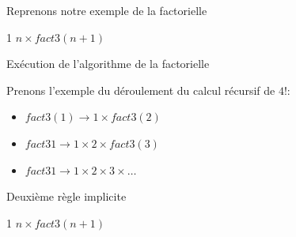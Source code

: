 \documentclass[10pt,xcolor=dvipsnames]{beamer}
\begin{document}
\begin{frame}{Reprenons notre exemple de la factorielle}
    
    \begin{tcolorbox}
  \begin{algorithmic}[1]
        \State{} 1
      \Else
        \State{} $n \times fact3(n+1)$
      \EndIf
    \EndFunction
  \end{algorithmic}
\end{tcolorbox}

\end{frame}

\begin{frame}{Exécution de l'algorithme de la factorielle}

Prenons l'exemple du déroulement du calcul récursif de $4!$:
\begin{center}
    \begin{itemize}[<+->]
\item[] $fact3(1) \rightarrow 1 \times fact3(2)$
\item[] $fact3{1} \rightarrow 1 \times 2 \times fact3(3)$
\item[] $fact3{1} \rightarrow 1 \times 2 \times 3 \times \ldots$
\end{itemize}
\end{center}

\end{frame}

\begin{frame}{Deuxième règle implicite}
        \begin{tcolorbox}
  \begin{algorithmic}[1]
        \State{} 1
      \Else
        \State{} $n \times fact3(n+1)$
      \EndIf
    \EndFunction
  \end{algorithmic}
\end{tcolorbox}
\end{frame}
\end{document}
